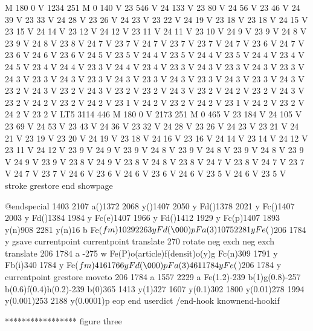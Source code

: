 M 180 0 V 1234 251 M 0 140 V 23 546 V 24 133 V 23 80 V 24 56 V 23 46
V 24 39 V 23 33 V 24 28 V 23 26 V 24 23 V 23 22 V 24 19 V 23 18 V 23
18 V 24 15 V 23 15 V 24 14 V 23 12 V 24 12 V 23 11 V 24 11 V 23 10
V 24 9 V 23 9 V 24 8 V 23 9 V 24 8 V 23 8 V 24 7 V 23 7 V 24 7 V 23
7 V 23 7 V 24 7 V 23 6 V 24 7 V 23 6 V 24 6 V 23 6 V 24 5 V 23 5 V
24 4 V 23 5 V 24 4 V 23 5 V 24 4 V 23 4 V 24 5 V 23 4 V 24 4 V 23 3
V 24 4 V 23 4 V 23 3 V 24 3 V 23 3 V 24 3 V 23 3 V 24 3 V 23 3 V 24
3 V 23 3 V 24 3 V 23 3 V 24 3 V 23 3 V 24 3 V 23 3 V 24 3 V 23 2 V
24 3 V 23 2 V 24 3 V 23 2 V 23 2 V 24 3 V 23 2 V 24 2 V 23 2 V 24 3
V 23 2 V 24 2 V 23 2 V 24 2 V 23 1 V 24 2 V 23 2 V 24 2 V 23 1 V 24
2 V 23 2 V 24 2 V 23 2 V LT5 3114 446 M 180 0 V 2173 251 M 0 465 V
23 184 V 24 105 V 23 69 V 24 53 V 23 43 V 24 36 V 23 32 V 24 28 V 23
26 V 24 23 V 23 21 V 24 21 V 23 19 V 23 20 V 24 19 V 23 18 V 24 16
V 23 16 V 24 14 V 23 14 V 24 12 V 23 11 V 24 12 V 23 9 V 24 9 V 23
9 V 24 8 V 23 9 V 24 8 V 23 9 V 24 8 V 23 9 V 24 9 V 23 9 V 23 8 V
24 9 V 23 8 V 24 8 V 23 8 V 24 7 V 23 8 V 24 7 V 23 7 V 24 7 V 23 7
V 24 6 V 23 6 V 24 6 V 23 6 V 24 6 V 23 5 V 24 6 V 23 5 V stroke grestore
end showpage
 
@endspecial 1403 2107 a()1372
2068 y()1407 2050 y Fd()1378 2021 y Fc()1407
2003 y Fd()1384 1984 y Fc(e)1407 1966 y Fd()1412
1929 y Fc(p)1407 1893 y(n)908 2281 y(n)16 b Fe(\(fm)1029
2263 y Fd(\000)p Fa(3)1075 2281 y Fe(\))206 1784 y
 gsave currentpoint currentpoint translate 270 rotate neg exch neg
exch translate
 206
1784 a -275 w Fe(P)o(article)f(densit)o(y)g Fc(n)309
1791 y Fb(i)340 1784 y Fe(\(fm)416 1766 y Fd(\000)p Fa(3)461
1784 y Fe(\))206 1784 y
 currentpoint grestore moveto
 206 1784 a 1557 2229 a Fe(1.2)-239
b(1)g(0.8)-257 b(0.6)f(0.4)h(0.2)-239 b(0)365 1413 y(1)327
1607 y(0.1)302 1800 y(0.01)278 1994 y(0.001)253 2188
y(0.0001)p eop
end
userdict /end-hook known{end-hook}if






*****************    figure three

